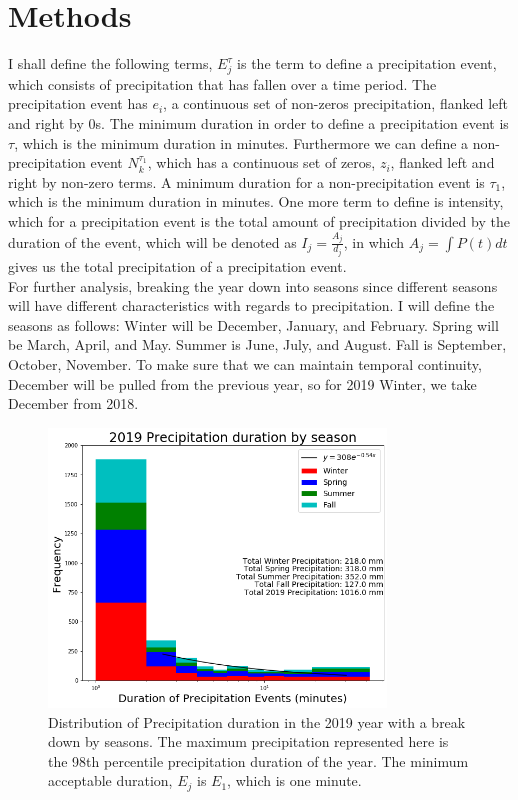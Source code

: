 \documentclass[11pt]{report}
\begin{document}
\section{Methods \label{sec:methods}}
I shall define the following terms, $E_j^\tau $ is the term to define a precipitation event, which consists of precipitation that has fallen over a time period. The precipitation event has $e_i$, a continuous set of non-zeros precipitation, flanked left and right by 0s. The minimum duration in order to define a precipitation event is $\tau$, which is the minimum duration in minutes. Furthermore we can define a non-precipitation event $N_k^{\tau_1}$, which has a continuous set of zeros, $z_i$, flanked left and right by non-zero terms. A minimum duration for a non-precipitation event is $\tau_1$, which is the minimum duration in minutes. One more term to define is intensity, which for a precipitation event is the total amount of precipitation divided by the duration of the event, which will be denoted as $I_j = \frac{A_j}{d_j}$, in which $A_j = \int P(t) dt$ gives us the total precipitation of a precipitation event. 
\\ 
For further analysis, breaking the year down into seasons since different seasons will have different characteristics with regards to precipitation. I will define the seasons as follows: Winter will be December, January, and February. Spring will be March, April, and May. Summer is June, July, and August. Fall is September, October, November. To make sure that we can maintain temporal continuity, December will be pulled from the previous year, so for 2019 Winter, we take December from 2018. 
\begin{figure}[h]
	\centering
	\includegraphics[width=0.8\textwidth]{Figures/More_detail_precip_2019.png}
	\caption{\label{Precipitation histogram for 2019 seasons} Distribution of Precipitation duration in the 2019 year with a break down by seasons. The maximum precipitation represented here is the 98th percentile precipitation duration of the year.  The minimum acceptable duration, $E_j$ is $E_1$, which is one minute.  }
\end{figure}
\end{document}
